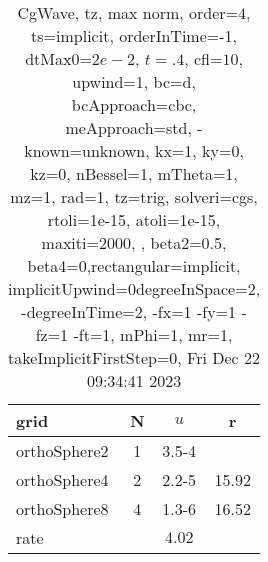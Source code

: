 \begin{table}[H]\tableFont %
\begin{center}
\begin{tabular}{|l|c|c|c|} \hline 
grid  & N &  $ u $ & r \\ \hline 
  orthoSphere2 &     1 & \num{3.5}{-4} &        \\ \hline
  orthoSphere4 &     2 & \num{2.2}{-5} & 15.92  \\ \hline
  orthoSphere8 &     4 & \num{1.3}{-6} & 16.52  \\ \hline
    rate             &       &  $4.02$       &       \\ \hline
\end{tabular}
\caption{CgWave, tz, max norm, order=$4$, ts=implicit, orderInTime=-1, dtMax0=$2e-2$, $t=.4$, cfl=$10$, upwind=1, bc=d, bcApproach=cbc, meApproach=std, -known=unknown, kx=1, ky=0, kz=0, nBessel=1, mTheta=1, mz=1, rad=1, tz=trig, solveri=cgs, rtoli=1e-15, atoli=1e-15, maxiti=2000, , beta2=0.5, beta4=0,rectangular=implicit, implicitUpwind=0degreeInSpace=2, -degreeInTime=2, -fx=1 -fy=1 -fz=1 -ft=1, mPhi=1, mr=1, takeImplicitFirstStep=0, Fri Dec 22 09:34:41 2023}\label{table:tzOrder4max}
\end{center}
\end{table}

